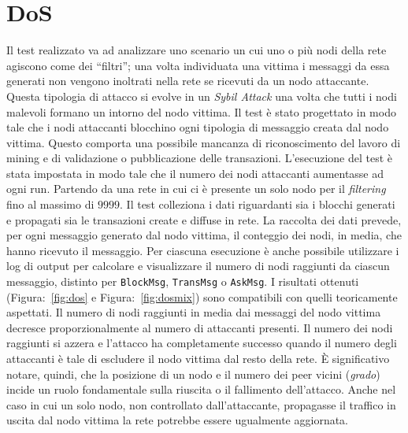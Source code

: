 \section{DoS}
Il test realizzato va ad analizzare uno scenario un cui uno o più nodi della rete agiscono come dei ``filtri''; una volta individuata una vittima i messaggi da essa generati non vengono inoltrati nella rete se ricevuti da un nodo attaccante.\newline
Questa tipologia di attacco si evolve in un \textit{Sybil Attack} una volta che tutti i nodi malevoli formano un intorno del nodo vittima.\newline
Il test è stato progettato in modo tale che i nodi attaccanti blocchino ogni tipologia di messaggio creata dal nodo vittima. Questo comporta una possibile mancanza di riconoscimento del lavoro di mining e di validazione o pubblicazione delle transazioni.\newline
L'esecuzione del test è stata impostata in modo tale che il numero dei nodi attaccanti aumentasse ad ogni run. Partendo da una rete in cui ci è presente un solo nodo per il \textit{filtering} fino al massimo di $9999$. Il test colleziona i dati riguardanti sia i blocchi generati e propagati sia le transazioni create e diffuse in rete.\newline
La raccolta dei dati prevede, per ogni messaggio generato dal nodo vittima, il conteggio dei nodi, in media, che hanno ricevuto il messaggio. Per ciascuna esecuzione è anche possibile utilizzare i log di output per calcolare e visualizzare il numero di nodi raggiunti da ciascun messaggio, distinto per \texttt{BlockMsg}, \texttt{TransMsg} o \texttt{AskMsg}.
I risultati ottenuti (Figura:~\ref{fig:dos} e Figura:~\ref{fig:dosmix}) sono compatibili con quelli teoricamente aspettati. Il numero di nodi raggiunti in media dai messaggi del nodo vittima decresce proporzionalmente al numero di attaccanti presenti.\newline
Il numero dei nodi raggiunti si azzera e l'attacco ha completamente successo quando il numero degli attaccanti è tale di escludere il nodo vittima dal resto della rete.\newline
È significativo notare, quindi, che la posizione di un nodo e il numero dei peer vicini (\textit{grado}) incide un ruolo fondamentale sulla riuscita o il fallimento dell'attacco. Anche nel caso in cui un solo nodo, non controllato dall'attaccante, propagasse il traffico in uscita dal nodo vittima la rete potrebbe essere ugualmente aggiornata.\newline

